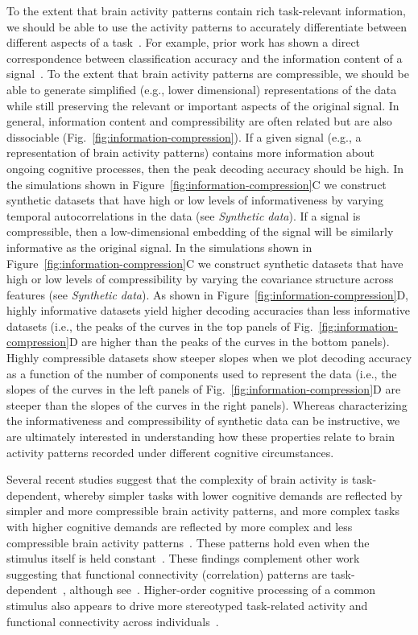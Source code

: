 \documentclass[english, 11pt]{article}
\begin{document}
To the extent that brain activity patterns contain rich task-relevant
information, we should be able to use the activity patterns to accurately
differentiate between different aspects of a task~\citep[e.g., using pattern
classifiers;][]{NormEtal06b}. For example, prior work has shown a direct
correspondence between classification accuracy and the information content of a
signal~\citep{Alva02}. To the extent that brain activity patterns are
compressible, we should be able to generate simplified (e.g., lower
dimensional) representations of the data while still preserving the relevant or
important aspects of the original signal. In general, information content and
compressibility are often related but are also dissociable
(Fig.~\ref{fig:information-compression}). If a given signal (e.g., a
representation of brain activity patterns) contains more information about
ongoing cognitive processes, then the peak decoding accuracy should be high. In
the simulations shown in Figure~\ref{fig:information-compression}C we construct
synthetic datasets that have high or low levels of informativeness by varying
temporal autocorrelations in the data (see \textit{Synthetic data}).
If a signal is compressible, then a low-dimensional embedding of the signal
will be similarly informative as the original signal.  In the simulations
shown in Figure~\ref{fig:information-compression}C we construct synthetic
datasets that have high or low levels of compressibility by varying
the covariance structure across features (see \textit{Synthetic data}).  As shown
in Figure~\ref{fig:information-compression}D, highly informative datasets
yield higher decoding accuracies than less informative datasets (i.e., the peaks of the curves in
the top panels of Fig.~\ref{fig:information-compression}D are higher than the
peaks of the curves in the bottom panels). Highly compressible datasets show
steeper slopes when we plot decoding accuracy as a function of the number of
components used to represent the data (i.e., the slopes of the curves in the
left panels of Fig.~\ref{fig:information-compression}D are steeper than the
slopes of the curves in the right panels).  Whereas characterizing
the informativeness and compressibility of synthetic data can be instructive,
we are ultimately interested in understanding how these properties relate to
brain activity patterns recorded under different cognitive circumstances.

Several recent studies suggest that the complexity of brain activity is
task-dependent, whereby simpler tasks with lower cognitive demands are
reflected by simpler and more compressible brain activity patterns, and more
complex tasks with higher cognitive demands are reflected by more complex and
less compressible brain activity patterns~\citep{MackEtal20, OwenEtal21}. These
patterns hold even when the stimulus itself is held
constant~\citep{MackEtal20}. These findings complement other work suggesting
that functional connectivity (correlation) patterns are
task-dependent~\citep{FinnEtal17, OwenEtal20, ColeEtal14}, although
see~\cite{GratEtal18}. Higher-order cognitive processing of a common stimulus
also appears to drive more stereotyped task-related activity and functional
connectivity across individuals~\citep{HassEtal08, LernEtal11, SimoChan20,
SimoEtal16}.
\end{document}
